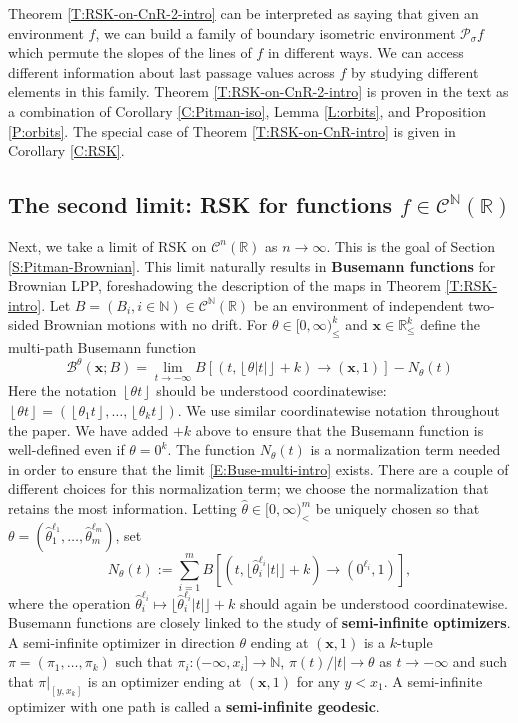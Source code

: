 \documentclass[11pt]{article}
\newcommand{\N}{\mathbb{N}}
\newcommand{\R}{\mathbb{R}}
\newcommand{\fl}[1]{{\left\lfloor #1 \right\rfloor}}
\newcommand{\sig}{\sigma}
\newcommand{\cB}{\mathcal{B}}
\newcommand{\cC}{\mathcal{C}}
\newcommand{\cP}{\mathcal{P}}
\newcommand{\bx}{\mathbf{x}}
\theoremstyle{definition} %
\theoremstyle{remark} %
\begin{document}
Theorem \ref{T:RSK-on-CnR-2-intro} can be interpreted as saying that given an environment $f$, we can build a family of boundary isometric environment $\cP_\sig f$ which permute the slopes of the lines of $f$ in different ways. We can access different information about last passage values across $f$ by studying different elements in this family. 
Theorem \ref{T:RSK-on-CnR-2-intro} is proven in the text as a combination of Corollary \ref{C:Pitman-iso}, Lemma \ref{L:orbits}, and Proposition \ref{P:orbits}. The special case of Theorem \ref{T:RSK-on-CnR-intro} is given in Corollary \ref{C:RSK}.

\subsection{The second limit: RSK for functions \texorpdfstring{$f \in \cC^\N(\R)$}{}}
\label{SS:RSK-2}

Next, we take a limit of RSK on $\cC^n(\R)$ as $n \to \infty$. This is the goal of Section \ref{S:Pitman-Brownian}. This limit naturally results in \textbf{Busemann functions} for Brownian LPP, foreshadowing the description of the maps in Theorem \ref{T:RSK-intro}. Let $B = (B_i, i \in \N) \in \cC^\N(\R)$ be an environment of independent two-sided Brownian motions with no drift. For $\theta \in [0, \infty)^k_\le$ and $\bx \in \R^k_\le$ define the multi-path Busemann function
\begin{equation}
	\label{E:Buse-multi-intro}
	\cB^\theta(\bx; B) = \lim_{t \to -\infty} B[(t, \fl{\theta |t|} +k) \to (\bx, 1)] - N_\theta(t)
\end{equation}
Here the notation $\fl{\theta t}$ should be understood coordinatewise: $\fl{\theta t} = (\fl{\theta_1 t}, \dots, \fl{\theta_k t})$. We use similar coordinatewise notation throughout the paper.
We have added $+k$ above to ensure that the Busemann function is well-defined even if $\theta = 0^k$. The function $N_\theta(t)$ is a normalization term needed in order to ensure that the limit \eqref{E:Buse-multi-intro} exists. There are a couple of different choices for this normalization term; we choose the normalization that retains the most information. Letting $\hat \theta \in [0, \infty)^m_<$ be uniquely chosen so that $\theta = (\hat \theta_1^{\ell_1}, \dots, \hat \theta_m^{\ell_m})$, set
$$
N_\theta(t) := \sum_{i=1}^{m} B[(t, \lfloor \hat \theta_i^{\ell_i} |t| \rfloor  +k) \to (0^{\ell_i}, 1)],
$$
where the operation $\hat \theta_i^{\ell_i} \mapsto \lfloor \hat \theta_i^{\ell_i} |t| \rfloor  +k$ should again be understood coordinatewise. Busemann functions are closely linked to the study of \textbf{semi-infinite optimizers}. A semi-infinite optimizer in direction $\theta$ ending at $(\bx, 1)$ is a $k$-tuple $\pi = (\pi_1, \dots, \pi_k)$ such that $\pi_i:(-\infty, x_i] \to \N$, $\pi(t)/|t| \to \theta$ as $t \to -\infty$ and such that $\pi|_{[y, x_k]}$ is an optimizer ending at $(\bx, 1)$ for any $y < x_1$. A semi-infinite optimizer with one path is called a \textbf{semi-infinite geodesic}.
\end{document}
